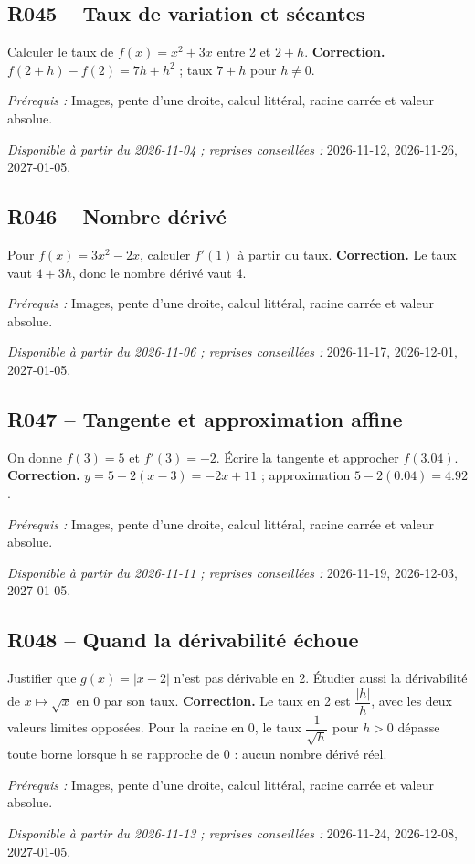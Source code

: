 \subsection*{R045 -- Taux de variation et sécantes}\label{R045}
Calculer le taux de $f(x)=x^2+3x$ entre 2 et $2+h$.
\ifmxteacher\textbf{Correction.} $f(2+h)-f(2)=7h+h^2$ ; taux $7+h$ pour $h\ne0$.\par\textit{Prérequis :} Images, pente d’une droite, calcul littéral, racine carrée et valeur absolue.\par\textit{Disponible à partir du 2026-11-04 ; reprises conseillées :} 2026-11-12, 2026-11-26, 2027-01-05.\fi
{}\subsection*{R046 -- Nombre dérivé}\label{R046}
Pour $f(x)=3x^2-2x$, calculer $f\prime(1)$ à partir du taux.
\ifmxteacher\textbf{Correction.} Le taux vaut $4+3h$, donc le nombre dérivé vaut 4.\par\textit{Prérequis :} Images, pente d’une droite, calcul littéral, racine carrée et valeur absolue.\par\textit{Disponible à partir du 2026-11-06 ; reprises conseillées :} 2026-11-17, 2026-12-01, 2027-01-05.\fi
{}\subsection*{R047 -- Tangente et approximation affine}\label{R047}
On donne $f(3)=5$ et $f\prime(3)=-2$. Écrire la tangente et approcher $f(\num{3,04})$.
\ifmxteacher\textbf{Correction.} $y=5-2(x-3)=-2x+11$ ; approximation $5-2(\num{0,04})=\num{4,92}$.\par\textit{Prérequis :} Images, pente d’une droite, calcul littéral, racine carrée et valeur absolue.\par\textit{Disponible à partir du 2026-11-11 ; reprises conseillées :} 2026-11-19, 2026-12-03, 2027-01-05.\fi
{}\subsection*{R048 -- Quand la dérivabilité échoue}\label{R048}
Justifier que $g(x)=|x-2|$ n’est pas dérivable en 2. Étudier aussi la dérivabilité de $x\mapsto\sqrt{x}$ en 0 par son taux.
\ifmxteacher\textbf{Correction.} Le taux en 2 est $\dfrac{|h|}{h}$, avec les deux valeurs limites opposées. Pour la racine en 0, le taux $\dfrac{1}{\sqrt h}$ pour $h>0$ dépasse toute borne lorsque h se rapproche de 0 : aucun nombre dérivé réel.\par\textit{Prérequis :} Images, pente d’une droite, calcul littéral, racine carrée et valeur absolue.\par\textit{Disponible à partir du 2026-11-13 ; reprises conseillées :} 2026-11-24, 2026-12-08, 2027-01-05.\fi
